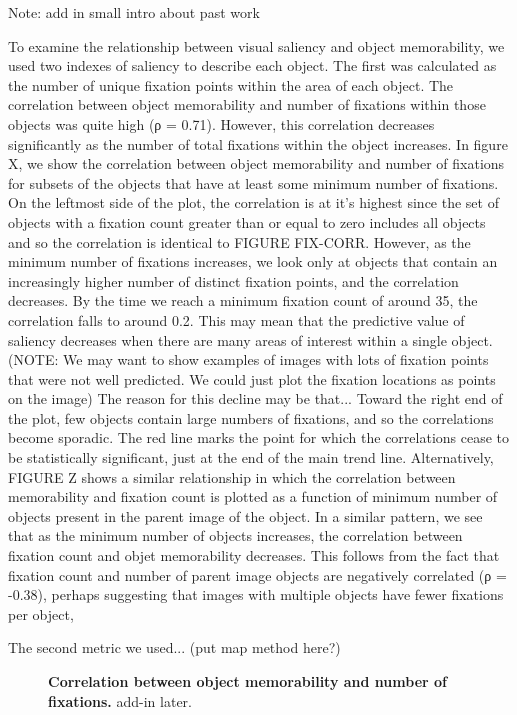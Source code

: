Note: add in small intro about past work

To examine the relationship between visual saliency and object memorability, we used two indexes of saliency to describe each object. The first was calculated as the number of unique fixation points within the area of each object. The correlation between object memorability and number of fixations within those objects was quite high (ρ = 0.71). However, this correlation decreases significantly as the number of total fixations within the object increases. In figure X, we show the correlation between object memorability and number of fixations for subsets of the objects that have at least some minimum number of fixations. On the leftmost side of the plot, the correlation is at it's highest since the set of objects with a fixation count greater than or equal to zero includes all objects and so the correlation is identical to FIGURE FIX-CORR. However, as the minimum number of fixations increases, we look only at objects that contain an increasingly higher number of distinct fixation points, and the correlation decreases. By the time we reach a minimum fixation count of around 35, the correlation falls to around 0.2. This may mean that the predictive value of saliency decreases when there are many areas of interest within a single object. (NOTE: We may want to show examples of images with lots of fixation points that were not well predicted. We could just plot the fixation locations as points on the image) The reason for this decline may be that... Toward the right end of the plot, few objects contain large numbers of fixations, and so the correlations become sporadic. The red line marks the point for which the correlations cease to be statistically significant, just at the end of the main trend line. Alternatively, FIGURE Z shows a similar relationship in which the correlation between memorability and fixation count is plotted as a function of minimum number of objects present in the parent image of the object. In a similar pattern, we see that as the minimum number of objects increases, the correlation between fixation count and objet memorability decreases. This follows from the fact that fixation count and number of parent image objects are negatively correlated (ρ = -0.38), perhaps suggesting that images with multiple objects have fewer fixations per object, 

The second metric we used... (put map method here?) 

\begin{figure}[t]
\centering
{}
\vspace{-5mm}\caption{\footnotesize\textbf{Correlation between object memorability and number of fixations.} add-in later. }\label{fig:exampleStimuli}
\end{figure}

